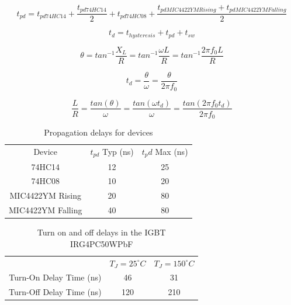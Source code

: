 \begin{equation} \label{eq:tpd}
    t_{pd} = t_{pd74HC14} + \frac{t_{pd74HC14}}{2} + t_{pd74HC08} + \frac{t_{pdMIC4422YM Rising}+t_{pdMIC4422YM Falling}}{2}
\end{equation}

\begin{equation} \label{eq:td}
    t_d = t_{hysteresis} + t_{pd} + t_{sw}
\end{equation}

\begin{equation} \label{eq:theta}
    \theta = {tan}^{-1}\frac{X_L}{R} = {tan}^{-1}\frac{\omega L}{R} = {tan}^{-1}\frac{2 \pi f_0 L}{R}
\end{equation}

\begin{equation} \label{eq:tdl}
    t_{d} = \frac{\theta}{\omega} = \frac{\theta}{2 \pi f_0}
\end{equation}

\begin{equation} \label{eq:lr}
    \frac{L}{R} = \frac{{tan}(\theta)}{\omega} = \frac{{tan}(\omega t_{d})}{\omega} = \frac{{tan}(2 \pi f_0 t_{d})}{2 \pi f_0}
\end{equation}

\begin{table}[]
    \centering
    \begin{tabular}{c|c|c}
        Device              & $t_{pd}$ Typ (ns)   & $t_pd$ Max (ns) \\
        74HC14              & 12            & 25\\
        74HC08              & 10            & 20\\
        MIC4422YM Rising    & 20            & 80\\
        MIC4422YM Falling   & 40            & 80
    \end{tabular}
    \caption{Propagation delays for devices}
    \label{tab:tpd}
\end{table}

\begin{table}[]
    \centering
    \begin{tabular}{c|c|c}
                            & $T_J = 25 ^{\circ}C$ & $T_J = 150 ^{\circ}C$ \\
        Turn-On Delay Time (ns)  & 46                & 31    \\
        Turn-Off Delay Time (ns) & 120               & 210
    \end{tabular}
    \caption{Turn on and off delays in the IGBT IRG4PC50WPbF}
    \label{tab:tigbt}
\end{table}

